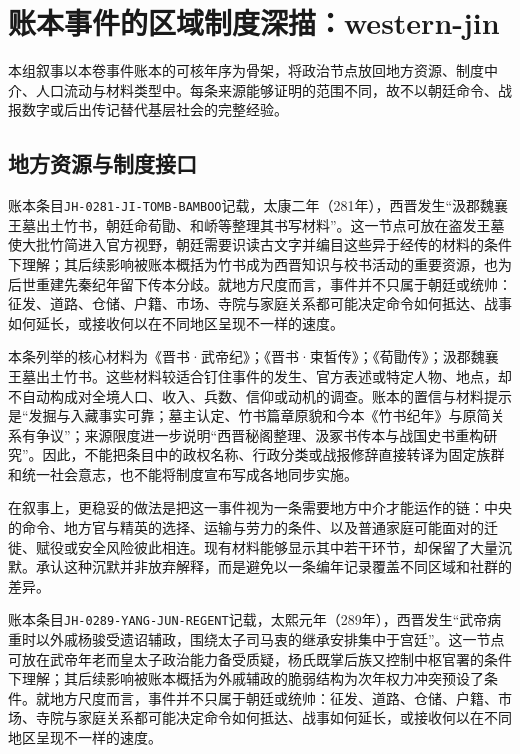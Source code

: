 \section{账本事件的区域制度深描：western-jin}

\label{sec:ledger-depth-western-jin}

本组叙事以本卷事件账本的可核年序为骨架，将政治节点放回地方资源、制度中介、人口流动与材料类型中。每条来源能够证明的范围不同，故不以朝廷命令、战报数字或后出传记替代基层社会的完整经验。

\subsection{地方资源与制度接口}

账本条目\texttt{JH-0281-JI-TOMB-BAMBOO}记载，太康二年（281年），西晋发生“汲郡魏襄王墓出土竹书，朝廷命荀勖、和峤等整理其书写材料”。这一节点可放在盗发王墓使大批竹简进入官方视野，朝廷需要识读古文字并编目这些异于经传的材料的条件下理解；其后续影响被账本概括为竹书成为西晋知识与校书活动的重要资源，也为后世重建先秦纪年留下传本分歧。就地方尺度而言，事件并不只属于朝廷或统帅：征发、道路、仓储、户籍、市场、寺院与家庭关系都可能决定命令如何抵达、战事如何延长，或接收何以在不同地区呈现不一样的速度。

本条列举的核心材料为《晋书·武帝纪》；《晋书·束皙传》；《荀勖传》；汲郡魏襄王墓出土竹书。这些材料较适合钉住事件的发生、官方表述或特定人物、地点，却不自动构成对全境人口、收入、兵数、信仰或动机的调查。账本的置信与材料提示是“发掘与入藏事实可靠；墓主认定、竹书篇章原貌和今本《竹书纪年》与原简关系有争议”；来源限度进一步说明“西晋秘阁整理、汲冢书传本与战国史书重构研究”。因此，不能把条目中的政权名称、行政分类或战报修辞直接转译为固定族群和统一社会意志，也不能将制度宣布写成各地同步实施。

在叙事上，更稳妥的做法是把这一事件视为一条需要地方中介才能运作的链：中央的命令、地方官与精英的选择、运输与劳力的条件、以及普通家庭可能面对的迁徙、赋役或安全风险彼此相连。现有材料能够显示其中若干环节，却保留了大量沉默。承认这种沉默并非放弃解释，而是避免以一条编年记录覆盖不同区域和社群的差异。

账本条目\texttt{JH-0289-YANG-JUN-REGENT}记载，太熙元年（289年），西晋发生“武帝病重时以外戚杨骏受遗诏辅政，围绕太子司马衷的继承安排集中于宫廷”。这一节点可放在武帝年老而皇太子政治能力备受质疑，杨氏既掌后族又控制中枢官署的条件下理解；其后续影响被账本概括为外戚辅政的脆弱结构为次年权力冲突预设了条件。就地方尺度而言，事件并不只属于朝廷或统帅：征发、道路、仓储、户籍、市场、寺院与家庭关系都可能决定命令如何抵达、战事如何延长，或接收何以在不同地区呈现不一样的速度。

